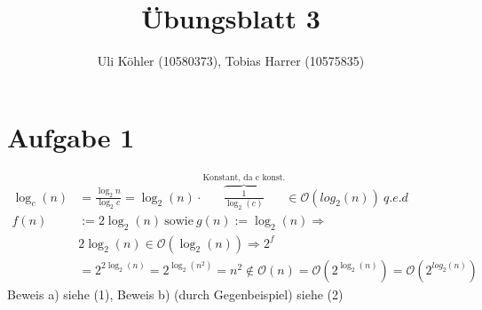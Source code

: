 \documentclass[a4paper,10pt,oneside,leqno]{scrartcl}
\title{Übungsblatt 3}
\author{Uli Köhler (10580373), Tobias Harrer (10575835)}
\begin{document}
\maketitle

\section*{Aufgabe 1}
\renewcommand{\theequation}{\alph{equation}}
\begin{align}
  \log_{c}(n) &= \frac{\log_{2}{n}}{\log_{2}{c}} = \log_2(n)\cdot\overbrace{\frac{1}{\log_2(c)}}^{\text{Konstant, da c konst.}} \in \mathcal{O}(log_2(n))\ q.e.d\\
  f(n) &:= 2\log_2(n)\ \text{sowie}\ g(n) := \log_2(n) \Longrightarrow\\
  &2\log_2(n) \in \mathcal{O}(\log_2(n)) \Longrightarrow 2^{f}\nonumber\\
  &=2^{2\log_2(n)}=2^{\log_2(n^2)}=n^2 \notin \mathcal{O}(n) = \mathcal{O}(2^{\log_2(n)}) = \mathcal{O}(2^{log_2(n)})\nonumber
\end{align}
Beweis a) siehe (1), Beweis b) (durch Gegenbeispiel) siehe (2)
\end{document}
